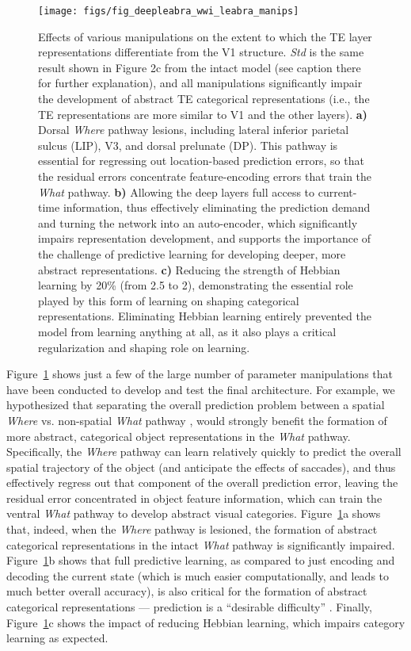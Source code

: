 \documentclass[12pt,twoside]{nature}
\newif\myifpdf
\begin{document}
\begin{figure}
  \centering\texttt{[image: figs/fig\_deepleabra\_wwi\_leabra\_manips]}
  \caption{\small Effects of various manipulations on the extent to which the TE layer representations differentiate from the V1 structure.  {\em Std} is the same result shown in Figure 2c from the intact model (see caption there for further explanation), and all manipulations significantly impair the development of abstract TE categorical representations (i.e., the TE representations are more similar to V1 and the other layers).  {\bf a)} Dorsal {\em Where} pathway lesions, including lateral inferior parietal sulcus (LIP), V3, and dorsal prelunate (DP).  This pathway is essential for regressing out location-based prediction errors, so that the residual errors concentrate feature-encoding errors that train the {\em What} pathway.  {\bf b)} Allowing the deep layers full access to current-time information, thus effectively eliminating the prediction demand and turning the network into an auto-encoder, which significantly impairs representation development, and supports the importance of the challenge of predictive learning for developing deeper, more abstract representations.  {\bf c)} Reducing the strength of Hebbian learning by 20\% (from 2.5 to 2), demonstrating the essential role played by this form of learning on shaping categorical representations.  Eliminating Hebbian learning entirely prevented the model from learning anything at all, as it also plays a critical regularization and shaping role on learning.}
  \label{fig.manips}
\end{figure}

Figure~\ref{fig.manips} shows just a few of the large number of parameter manipulations that have been conducted to develop and test the final architecture.  For example, we hypothesized that separating the overall prediction problem between a spatial {\em Where} vs. non-spatial {\em What} pathway \cite{UngerleiderMishkin82,GoodaleMilner92}, would strongly benefit the formation of more abstract, categorical object representations in the {\em What} pathway.  Specifically, the {\em Where} pathway can learn relatively quickly to predict the overall spatial trajectory of the object (and anticipate the effects of saccades), and thus effectively regress out that component of the overall prediction error, leaving the residual error concentrated in object feature information, which can train the ventral {\em What} pathway to develop abstract visual categories.  Figure~\ref{fig.manips}a shows that, indeed, when the {\em Where} pathway is lesioned, the formation of abstract categorical representations in the intact {\em What} pathway is significantly impaired.  Figure~\ref{fig.manips}b shows that full predictive learning, as compared to just encoding and decoding the current state (which is much easier computationally, and leads to much better overall accuracy), is also critical for the formation of abstract categorical representations --- prediction is a ``desirable difficulty'' \cite{Bjork94}.  Finally, Figure~\ref{fig.manips}c shows the impact of reducing Hebbian learning, which impairs category learning as expected.
\end{document}
